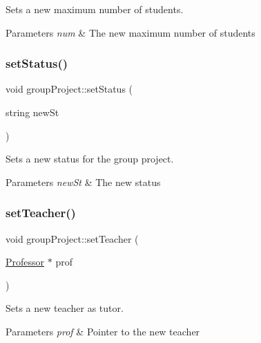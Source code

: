 Sets a new maximum number of students. 


\begin{DoxyParams}{Parameters}
{\em num} & The new maximum number of students \\
\hline
\end{DoxyParams}
\mbox{\label{classgroup_project_a2fc8f6b25bf9365c040bb7e36dbff587}} 
\subsubsection{\texorpdfstring{set\+Status()}{setStatus()}}
{\footnotesize\ttfamily void group\+Project\+::set\+Status (\begin{DoxyParamCaption}\item[{string}]{new\+St }\end{DoxyParamCaption})}



Sets a new status for the group project. 


\begin{DoxyParams}{Parameters}
{\em new\+St} & The new status \\
\hline
\end{DoxyParams}
\mbox{\label{classgroup_project_a12367c1192c7665efcbca4033905aeff}} 
\subsubsection{\texorpdfstring{set\+Teacher()}{setTeacher()}}
{\footnotesize\ttfamily void group\+Project\+::set\+Teacher (\begin{DoxyParamCaption}\item[{\hyperlink{class_professor}{Professor} $\ast$}]{prof }\end{DoxyParamCaption})}



Sets a new teacher as tutor. 


\begin{DoxyParams}{Parameters}
{\em prof} & Pointer to the new teacher \\
\hline
\end{DoxyParams}
\mbox{\label{classgroup_project_a4325f652c171171a820228218ca4dc5d}} 
